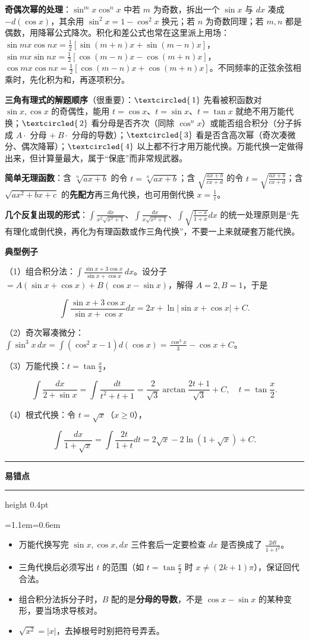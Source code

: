\documentclass[11pt,openany,UTF8]{ctexbook}
\newcommand{\circled}[1]{\textcircled{\scriptsize\,#1}}
\newcommand{\callouthead}[2]{%
  \par\addvspace{7pt}\noindent
  {\color{#1}\rule[-0.15em]{3pt}{1.05em}}\hspace{0.5em}%
  {\bfseries\color{#1}#2}\par\nobreak\vspace{-0.35em}%
  {\color{rulesep}\hrule height 0.4pt}\nobreak\vspace{0.45em}%
  \begingroup\small\setlength{\parindent}{0pt}%
  \leftskip=1.1em\rightskip=0.6em\noindent\ignorespaces}
\newcommand{\calloutend}{\par\endgroup\addvspace{7pt}}
\newenvironment{callwarn}[1]{\callouthead{warnbar}{#1}}{\calloutend}
\begin{document}
\textbf{奇偶次幂的处理}：$\sin^mx\cos^nx$ 中若 $m$ 为奇数，拆出一个 $\sin x$ 与 $dx$ 凑成 $-d(\cos x)$，其余用 $\sin^2x=1-\cos^2x$ 换元；若 $n$ 为奇数同理；若 $m,n$ 都是偶数，用降幂公式降次。积化和差公式也常在这里派上用场：$\sin mx\cos nx=\frac{1}{2}\left[\sin(m+n)x+\sin(m-n)x\right]$，$\sin mx\sin nx=\frac{1}{2}\left[\cos(m-n)x-\cos(m+n)x\right]$，$\cos mx\cos nx=\frac{1}{2}\left[\cos(m-n)x+\cos(m+n)x\right]$。不同频率的正弦余弦相乘时，先化积为和，再逐项积分。

\textbf{三角有理式的解题顺序}（很重要）：$\circled{1}$ 先看被积函数对 $\sin x,\cos x$ 的奇偶性，能用 $t=\cos x$、$t=\sin x$、$t=\tan x$ 就绝不用万能代换；$\circled{2}$ 看分母是否齐次（同除 $\cos^nx$）或能否组合积分（分子拆成 $A\cdot$ 分母 $+\ B\cdot$ 分母的导数）；$\circled{3}$ 看是否含高次幂（奇次凑微分、偶次降幂）；$\circled{4}$ 以上都不行才用万能代换。万能代换一定做得出来，但计算量最大，属于“保底”而非常规武器。

\textbf{简单无理函数}：含 $\sqrt[n]{ax+b}$ 的令 $t=\sqrt[n]{ax+b}$；含 $\sqrt{\frac{ax+b}{cx+d}}$ 的令 $t=\sqrt{\frac{ax+b}{cx+d}}$；含 $\sqrt{ax^2+bx+c}$ 的\textbf{先配方}再三角代换，也可用倒代换 $x=\frac{1}{t}$。

\textbf{几个反复出现的形式}：$\int\frac{dx}{x^2\sqrt{x^2+1}}$、$\int\frac{dx}{x\sqrt{x^2+1}}$、$\int\sqrt{\frac{1-x}{1+x}}dx$ 的统一处理原则是“先有理化或倒代换，再化为有理函数或作三角代换”，不要一上来就硬套万能代换。

\textbf{典型例子}

（1）组合积分法：$\displaystyle\int\frac{\sin x+3\cos x}{\sin x+\cos x}\,dx$。设分子 $=A(\sin x+\cos x)+B(\cos x-\sin x)$，解得 $A=2,B=1$，于是

\[\int\frac{\sin x+3\cos x}{\sin x+\cos x}dx=2x+\ln\lvert\sin x+\cos x\rvert+C.\]

（2）奇次幂凑微分：$\displaystyle\int\sin^3x\,dx=\int\left(\cos^2x-1\right)d(\cos x)=\frac{\cos^3x}{3}-\cos x+C$。

（3）万能代换：$t=\tan\frac{x}{2}$，

\[\int\frac{dx}{2+\sin x}=\int\frac{dt}{t^2+t+1}=\frac{2}{\sqrt{3}}\arctan\frac{2t+1}{\sqrt{3}}+C,\quad t=\tan\frac{x}{2}.\]

（4）根式代换：令 $t=\sqrt{x}$（$x\geq0$），

\[\int\frac{dx}{1+\sqrt{x}}=\int\frac{2t}{1+t}dt=2\sqrt{x}-2\ln\left(1+\sqrt{x}\right)+C.\]

\begin{callwarn}{易错点}
\begin{itemize}
\item 万能代换写完 $\sin x,\cos x,dx$ 三件套后一定要检查 $dx$ 是否换成了 $\frac{2dt}{1+t^2}$。
\item 三角代换后必须写出 $t$ 的范围（如 $t=\tan\frac{x}{2}$ 时 $x\neq(2k+1)\pi$），保证回代合法。
\item 组合积分法拆分子时，$B$ 配的是\textbf{分母的导数}，不是 $\cos x-\sin x$ 的某种变形，要当场求导核对。
\item $\sqrt{x^2}=\lvert x\rvert$，去掉根号时别把符号弄丢。
\end{itemize}
\end{callwarn}
\end{document}
